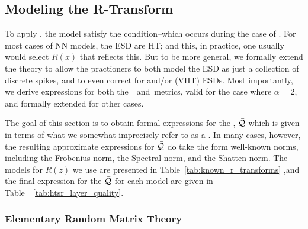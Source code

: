 \subsection{Modeling the R-Transform}
\label{sxn:r_transforms}

To apply \SETOL, the model satisfy the \TRACELOG condition--which occurs during the case of  \IdealLearning.
For most cases of NN models, the ESD are HT; and this, in practice, one usually would select $R(x)$ that reflects this.
But to be more general, we formally extend the theory to allow the practioners to
both model the ESD as just a collection of discrete spikes, and to even correct for
\CorrelationTraps and/or \VeryHeavyTailed (VHT) ESDs.
Most importantly,  we derive expressions for both the~\WW~\ALPHA and~\ALPHAHAT metrics, valid
for the case \IdealLearning where $\alpha=2$, and formally extended for other cases.

The goal of this section is to obtain formal expressions for the \LayerQuality, $\bar{\mathcal{Q}}$ which is
given in terms of what we somewhat imprecisely refer to as a \GEN.
In many cases, however, the resulting approximate expressions for $\bar{\mathcal{Q}}$ do take the
form well-known norms, including the Frobenius norm, the Spectral norm, and the Shatten norm.
The models for $R(z)$  we use are presented in Table~\ref{tab:known_r_transforms} ,and
the final expression for the \LayerQuality $\bar{\mathcal{Q}}$ for each model are given in Table~~\ref{tab:htsr_layer_quality}.

\subsubsection{Elementary Random Matrix Theory}
\label{sxn:r_transforms:elementary_rmt}

